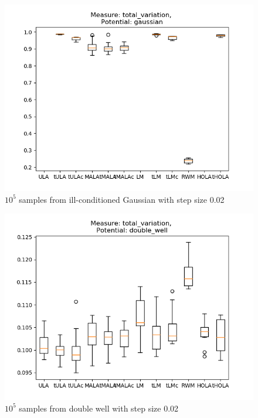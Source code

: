 \begin{figure}[ht!]
	\centering
		\includegraphics[height=0.43\textheight]{Figures/TV_ICgaussian10pt0001_step0pt02.png}
	\caption{$10^5$ samples from ill-conditioned Gaussian with step size 0.02}
	\label{fig:TV_ICgauss}
\end{figure}

\begin{figure}[ht!]
	\centering
		\includegraphics[height=0.43\textheight]{WriteUp/TV_doublewell_step0pt02.png}
	\caption{$10^5$ samples from double well with step size 0.02}
	\label{fig:TVdouble02}
\end{figure}

